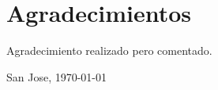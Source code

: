 \chapter*{Agradecimientos}
\thispagestyle{empty}

Agradecimiento realizado pero comentado.





\vspace*{1cm}

\thesisAuthor

San Jose, \today

\cleardoublepage

